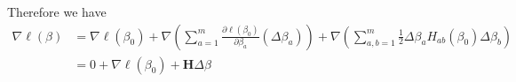 \documentclass[12pt, oneside]{article}
\begin{document}
Therefore we have
\begin{align}
\nabla \ell(\beta)&=\nabla \ell(\beta_0)+\nabla\left(\sum\limits_{a=1}^m\frac{\partial{\ell(\beta_0)}}{\partial\beta_a}(\Delta\beta_a)\right)+\nabla\left(\sum\limits_{a,b=1}^m\frac{1}{2}\Delta\beta_a{H_{ab}}(\beta_0)\Delta\beta_b\right)\\
& =0+\nabla \ell(\beta_0)+\mathbf{H}\Delta\beta
\end{align}
\end{document}
